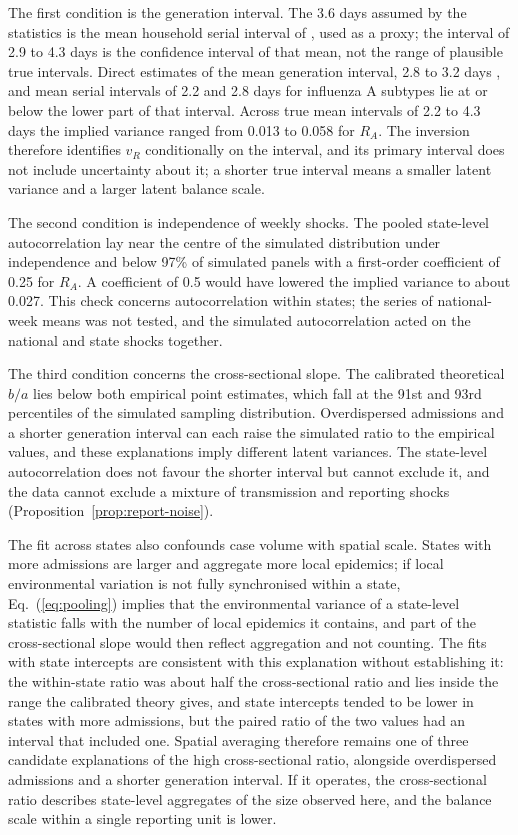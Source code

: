 The first condition is the generation interval. The 3.6 days assumed by the statistics is the mean household serial interval of \citet{cowling2009estimation}, used as a proxy; the interval of 2.9 to 4.3 days is the confidence interval of that mean, not the range of plausible true intervals. Direct estimates of the mean generation interval, 2.8 to 3.2 days \citep{chan2025estimating}, and mean serial intervals of 2.2 and 2.8 days for influenza A subtypes \citep{vink2014serial} lie at or below the lower part of that interval. Across true mean intervals of 2.2 to 4.3 days the implied variance ranged from 0.013 to 0.058 for $R_A$. The inversion therefore identifies $v_R$ conditionally on the interval, and its primary interval does not include uncertainty about it; a shorter true interval means a smaller latent variance and a larger latent balance scale.

The second condition is independence of weekly shocks. The pooled state-level autocorrelation lay near the centre of the simulated distribution under independence and below 97\% of simulated panels with a first-order coefficient of 0.25 for $R_A$. A coefficient of 0.5 would have lowered the implied variance to about 0.027. This check concerns autocorrelation within states; the series of national-week means was not tested, and the simulated autocorrelation acted on the national and state shocks together.

The third condition concerns the cross-sectional slope. The calibrated theoretical $b/a$ lies below both empirical point estimates, which fall at the 91st and 93rd percentiles of the simulated sampling distribution. Overdispersed admissions and a shorter generation interval can each raise the simulated ratio to the empirical values, and these explanations imply different latent variances. The state-level autocorrelation does not favour the shorter interval but cannot exclude it, and the data cannot exclude a mixture of transmission and reporting shocks (Proposition~\ref{prop:report-noise}).

The fit across states also confounds case volume with spatial scale. States with more admissions are larger and aggregate more local epidemics; if local environmental variation is not fully synchronised within a state, Eq.~(\ref{eq:pooling}) implies that the environmental variance of a state-level statistic falls with the number of local epidemics it contains, and part of the cross-sectional slope would then reflect aggregation and not counting. The fits with state intercepts are consistent with this explanation without establishing it: the within-state ratio was about half the cross-sectional ratio and lies inside the range the calibrated theory gives, and state intercepts tended to be lower in states with more admissions, but the paired ratio of the two values had an interval that included one. Spatial averaging therefore remains one of three candidate explanations of the high cross-sectional ratio, alongside overdispersed admissions and a shorter generation interval. If it operates, the cross-sectional ratio describes state-level aggregates of the size observed here, and the balance scale within a single reporting unit is lower.

